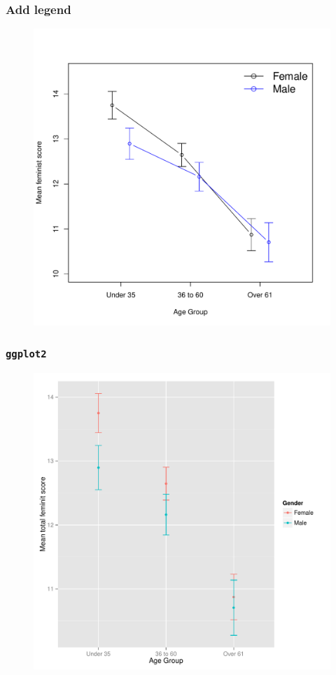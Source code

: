 \documentclass{beamer}\usepackage[]{graphicx}\usepackage[]{color}
\begin{document}
\begin{frame}[fragile]
  \frametitle{Add legend}

\begin{figure}[h]
  \vspace{-20pt}
  \centering
  \includegraphics[height = 0.7\textwidth, keepaspectratio]{Figure/m11}
  \label{fig:m11}
\end{figure}
\end{frame}



\begin{frame}[fragile]
  \frametitle{\texttt{ggplot2}}

\begin{figure}[h]
  \vspace{-20pt}
  \centering
  \includegraphics[height = 0.7\textwidth, keepaspectratio]{Figure/gg1}
  \label{fig:gg1}
\end{figure}
\end{frame} 
\end{document}
